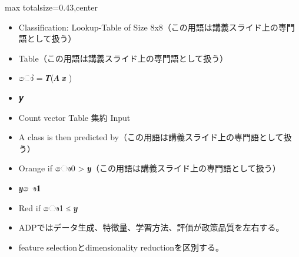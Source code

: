 \clearpage
{}
\begin{minipage}[t]{0.405\textwidth}
\begin{adjustbox}{max totalsize={\textwidth}{0.43\textheight},center}
\begin{minipage}{\textwidth}\scriptsize
{}\begin{itemize}
\item Classification: Lookup-Table of Size 8x8（この用語は講義スライド上の専門語として扱う）
\item Table（この用語は講義スライド上の専門語として扱う）
\item ෝ = 𝑻(𝑨 𝒙 )
\item 𝒚
\item Count vector Table 集約 Input
\item A class is then predicted by（この用語は講義スライド上の専門語として扱う）
\item Orange if ෞ0 > 𝒚（この用語は講義スライド上の専門語として扱う）
\item 𝒚 ෞ𝟏
\item Red if ෞ1 ≤ 𝒚
\end{itemize}\begin{itemize}
\item ADPではデータ生成、特徴量、学習方法、評価が政策品質を左右する。
\item feature selectionとdimensionality reductionを区別する。
\end{itemize}
\end{minipage}
\end{adjustbox}
\end{minipage}\hfill
